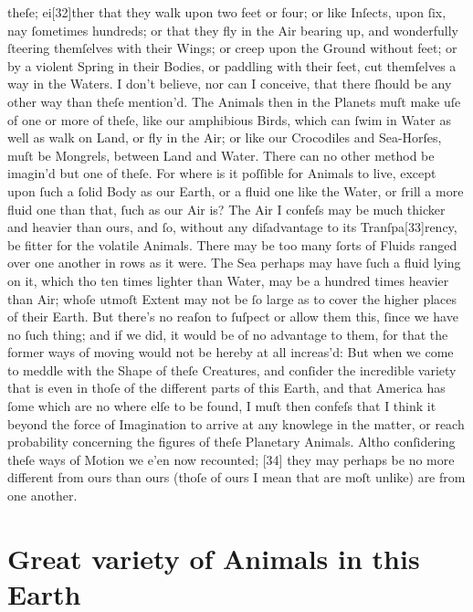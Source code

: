 \documentclass[letterpaper]{book}
\begin{document}
theſe; ei[32]ther that they walk upon two feet or four; or like Inſects,
upon ſix, nay ſometimes hundreds; or that they fly in the Air bearing up,
and wonderfully ſteering themſelves with their Wings; or creep upon the
Ground without feet; or by a violent Spring in their Bodies, or paddling
with their feet, cut themſelves a way in the Waters.  I don't believe, nor
can I conceive, that there ſhould be any other way than theſe mention'd. The
Animals then in the Planets muſt make uſe of one or more of theſe, like our
amphibious Birds, which can ſwim in Water as well as walk on Land, or fly in
the Air; or like our Crocodiles and Sea-Horſes, muſt be Mongrels, between
Land and Water. There can no other method be imagin'd but one of theſe. For
where is it poſſible for Animals to live, except upon ſuch a ſolid Body as
our Earth, or a fluid one like the Water, or ſrill a more fluid one than
that, ſuch as our Air is? The Air I confeſs may be much thicker and heavier
than ours, and ſo, without any diſadvantage to its Tranſpa[33]rency, be
fitter for the volatile Animals. There may be too many ſorts of Fluids
ranged over one another in rows as it were. The Sea perhaps may have ſuch a
fluid lying on it, which tho ten times lighter than Water, may be a hundred
times heavier than Air; whoſe utmoſt Extent may not be ſo large as to cover
the higher places of their Earth. But there's no reaſon to ſuſpect or allow
them this, ſince we have no ſuch thing; and if we did, it would be of no
advantage to them, for that the former ways of moving would not be hereby at
all increas'd: But when we come to meddle with the Shape of theſe Creatures,
and conſider the incredible variety that is even in thoſe of the different
parts of this Earth, and that America has ſome which are no where elſe to be
found, I muſt then confeſs that I think it beyond the force of Imagination
to arrive at any knowlege in the matter, or reach probability concerning the
figures of theſe Planetary Animals. Altho conſidering theſe ways of Motion
we e'en now recounted; [34] they may perhaps be no more different from ours
than ours (thoſe of ours I mean that are moſt unlike) are from one another.


\section{Great variety of Animals in this Earth}
\end{document}
